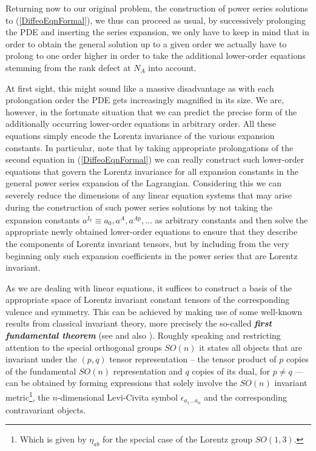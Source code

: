 Returning now to our original problem, the construction of power series solutions to (\ref{DiffeoEqnFormal}), we thus can proceed as usual, by successively prolonging the PDE and inserting the series expansion, we only have to keep in mind that in order to obtain the general solution up to a given order we actually have to prolong to one order higher in order to take the additional lower-order equations stemming from the rank defect at $N_A$ into account. 

At first sight, this might sound like a massive disadvantage as with each prolongation order the PDE gets increasingly magnified in its size. We are, however, in the fortunate situation that we can predict the precise form of the additionally occurring lower-order equations in arbitrary order. All these equations simply encode the Lorentz invariance of the various expansion constants. In particular, note that by taking appropriate prolongations of the second equation in (\ref{DiffeoEqnFormal}) we can really construct such lower-order equations that govern the Lorentz invariance for all expansion constants in the general power series expansion of the Lagrangian. 
Considering this we can severely reduce the dimensions of any linear equation systems that may arise during the construction of such power series solutions by not taking the expansion constants $a^{\tilde{I}_k} \equiv a_0, a^A, a^{Ap},...$ as arbitrary constants and then solve the appropriate newly obtained lower-order equations to ensure that they describe the components of Lorentz invariant tensors, but by including from the very beginning only such expansion coefficients in the power series that are Lorentz invariant.

As we are dealing with linear equations, it suffices to construct a basis of the appropriate space of Lorentz invariant constant tensors of the corresponding valence and symmetry. This can be achieved by making use of some well-known results from classical invariant theory, more precisely the so-called \textit{\textbf{first fundamental theorem}} (see \cite{Aslaksen1995InvariantTO} and also \cite{PROCESI1976306}). Roughly speaking and restricting attention to the special orthogonal groups $SO(n)$ it states all objects that are invariant under the $(p,q)$ tensor representation -- the tensor product of $p$ copies of the fundamental $SO(n)$ representation and $q$ copies of its dual, for $p \neq q$ --- can be obtained by forming expressions that solely involve the $SO(n)$ invariant metric\footnote{Which is given by $\eta_{ab}$ for the special case of the Lorentz group $SO(1,3)$.}, the $n$-dimensional Levi-Civita symbol $\epsilon_{a_1...a_n}$ and the corresponding contravariant objects. 

